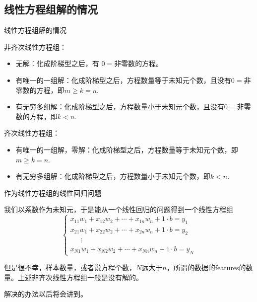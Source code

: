 
\subsection{线性方程组解的情况}


\begin{frame}{线性方程组解的情况}

非齐次线性方程组：
\begin{itemize}
\item 无解：{\color{red}化成阶梯型之后}，有{\color{red} $0 = $非零数}的方程。
\item 有唯一的一组解：{\color{red}化成阶梯型之后}，方程数量等于未知元个数，且{\color{red}没有$0 = $非零数}的方程，即$m \geqslant k = n.$
\item 有无穷多组解：{\color{red}化成阶梯型之后}，方程数量小于未知元个数，且{\color{red}没有$0 = $非零数}的方程，即$k < n.$
\end{itemize}

\vspace{1em}
\pause

齐次线性方程组：
\begin{itemize}
\item 有唯一的一组解，零解：{\color{red}化成阶梯型之后}，方程数量等于未知元个数，即$m \geqslant k = n.$
\item 有无穷多组解：{\color{red}化成阶梯型之后}，方程数量小于未知元个数，即$k < n.$
\end{itemize}

\end{frame}


\begin{frame}{作为线性方程组的线性回归问题}

我们以系数作为未知元，于是能从一个线性回归的问题得到一个线性方程组
\[
\begin{cases}
x_{11}w_1 + x_{12}w_2 + \cdots + x_{1n}w_n + 1\cdot b = y_1 \\
x_{21}w_1 + x_{22}w_2 + \cdots + x_{2n}w_n + 1\cdot b = y_2 \\
\phantom{yyy} \vdots \\
x_{N1}w_1 + x_{N2}w_2 + \cdots + x_{Nn}w_n + 1\cdot b = y_N
\end{cases}\]

\pause

但是很不幸，样本数量，或者说方程个数，$N$远大于$n$，所谓的数据的features的数量。上述非齐次线性方程组一般是没有解的。

解决的办法以后将会讲到。

\end{frame}

